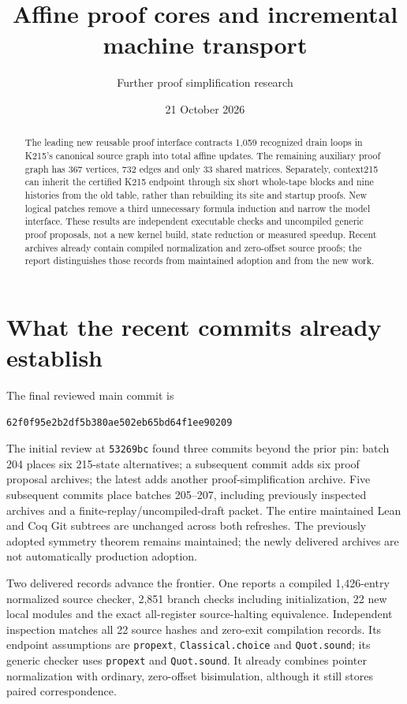 \documentclass[11pt]{article}
\title{Affine proof cores and incremental machine transport}
\author{Further proof simplification research}\date{21 October 2026}
\begin{document}
\maketitle
\begin{abstract}
The leading new reusable proof interface contracts 1,059 recognized drain loops in K215's canonical source graph into total affine updates. The remaining auxiliary proof graph has 367 vertices, 732 edges and only 33 shared matrices. Separately, context215 can inherit the certified K215 endpoint through six short whole-tape blocks and nine histories from the old table, rather than rebuilding its site and startup proofs. New logical patches remove a third unnecessary formula induction and narrow the model interface. These results are independent executable checks and uncompiled generic proof proposals, not a new kernel build, state reduction or measured speedup. Recent archives already contain compiled normalization and zero-offset source proofs; the report distinguishes those records from maintained adoption and from the new work.
\end{abstract}

\section{What the recent commits already establish}
The final reviewed main commit is
\begin{verbatim}
62f0f95e2b2df5b380ae502eb65bd64f1ee90209
\end{verbatim}
The initial review at \texttt{53269bc} found three commits beyond the prior pin: batch 204 places six 215-state alternatives; a subsequent commit adds six proof proposal archives; the latest adds another proof-simplification archive. Five subsequent commits place batches 205--207, including previously inspected archives and a finite-replay/uncompiled-draft packet. The entire maintained Lean and Coq Git subtrees are unchanged across both refreshes. The previously adopted symmetry theorem remains maintained; the newly delivered archives are not automatically production adoption.

Two delivered records advance the frontier. One reports a compiled 1,426-entry normalized source checker, 2,851 branch checks including initialization, 22 new local modules and the exact all-register source-halting equivalence. Independent inspection matches all 22 source hashes and zero-exit compilation records. Its endpoint assumptions are \texttt{propext}, \texttt{Classical.choice} and \texttt{Quot.sound}; its generic checker uses \texttt{propext} and \texttt{Quot.sound}. It already combines pointer normalization with ordinary, zero-offset bisimulation, although it still stores paired correspondence.
\end{document}
